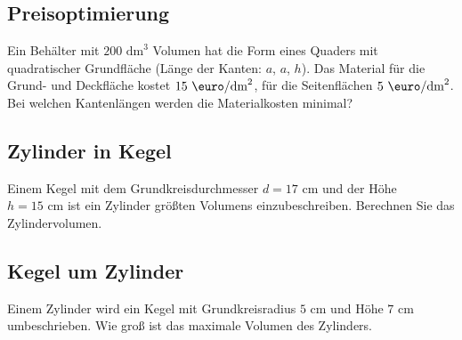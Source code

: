

\subsection{Preisoptimierung}

Ein Behälter mit $200 \text{ dm}^3$ Volumen hat die
Form eines Quaders mit quadratischer Grundfläche (Länge der Kanten: $a$, $a$, $h$). Das Material für die Grund-
und Deckfläche kostet $15 \text{ \euro} / \text{dm}^2$, für die Seitenflächen
$5 \text{ \euro} / \text{dm}^2$. Bei welchen Kantenlängen werden die Materialkosten minimal?






\subsection{Zylinder in Kegel}
Einem Kegel mit dem Grundkreisdurchmesser $d = 17 \text{ cm}$ und der Höhe $h
= 15 \text{ cm}$ ist ein Zylinder größten Volumens einzubeschreiben. Berechnen Sie das Zylindervolumen.


\subsection{Kegel um Zylinder}

Einem Zylinder wird ein Kegel mit Grundkreisradius $5 \text{ cm}$ und
Höhe $7 \text{ cm}$ umbeschrieben. Wie groß ist das maximale Volumen
des Zylinders.





